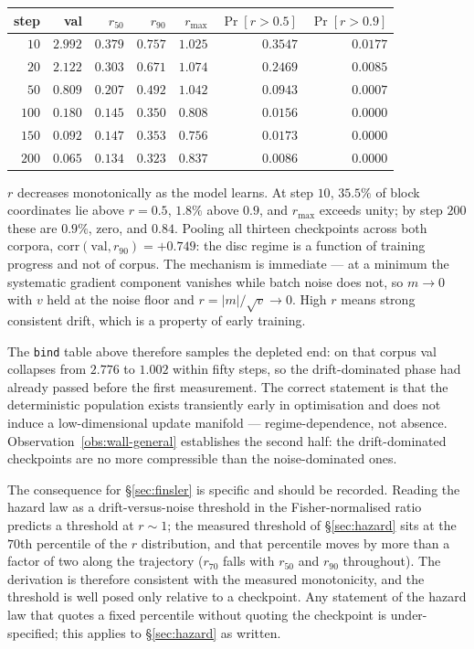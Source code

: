 \begin{center}
\begin{tabular}{rrrrrrr}
\hline
step & val & $r_{50}$ & $r_{90}$ & $r_{\max}$ & $\Pr[r>0.5]$ & $\Pr[r>0.9]$ \\
\hline
$10$  & $2.992$ & $0.379$ & $0.757$ & $1.025$ & $0.3547$ & $0.0177$ \\
$20$  & $2.122$ & $0.303$ & $0.671$ & $1.074$ & $0.2469$ & $0.0085$ \\
$50$  & $0.809$ & $0.207$ & $0.492$ & $1.042$ & $0.0943$ & $0.0007$ \\
$100$ & $0.180$ & $0.145$ & $0.350$ & $0.808$ & $0.0156$ & $0.0000$ \\
$150$ & $0.092$ & $0.147$ & $0.353$ & $0.756$ & $0.0173$ & $0.0000$ \\
$200$ & $0.065$ & $0.134$ & $0.323$ & $0.837$ & $0.0086$ & $0.0000$ \\
\hline
\end{tabular}
\end{center}

\begin{observation}
\label{obs:regime-negative}
$r$ decreases monotonically as the model learns. At step $10$, $35.5\%$ of
block coordinates lie above $r=0.5$, $1.8\%$ above $0.9$, and $r_{\max}$
exceeds unity; by step $200$ these are $0.9\%$, zero, and $0.84$. Pooling all
thirteen checkpoints across both corpora, $\mathrm{corr}(\text{val},r_{90})
= +0.749$: the disc regime is a function of training progress and not of
corpus. The mechanism is immediate --- at a minimum the systematic gradient
component vanishes while batch noise does not, so $m\to0$ with $v$ held at the
noise floor and $r=|m|/\sqrt{v}\to0$. High $r$ means strong consistent drift,
which is a property of early training.
\end{observation}

The \texttt{bind} table above therefore samples the depleted end: on that
corpus val collapses from $2.776$ to $1.002$ within fifty steps, so the
drift-dominated phase had already passed before the first measurement. The
correct statement is that the deterministic population exists transiently early
in optimisation and does not induce a low-dimensional update manifold ---
regime-dependence, not absence. Observation~\ref{obs:wall-general} establishes
the second half: the drift-dominated checkpoints are no more compressible than
the noise-dominated ones.

The consequence for \S\ref{sec:finsler} is specific and should be recorded.
Reading the hazard law as a drift-versus-noise threshold in the
Fisher-normalised ratio predicts a threshold at $r\sim1$; the measured
threshold of \S\ref{sec:hazard} sits at the $70$th percentile of the $r$
distribution, and that percentile moves by more than a factor of two along the
trajectory ($r_{70}$ falls with $r_{50}$ and $r_{90}$ throughout). The
derivation is therefore consistent with the measured monotonicity, and the
threshold is well posed only relative to a checkpoint. Any statement of the
hazard law that quotes a fixed percentile without quoting the checkpoint is
under-specified; this applies to \S\ref{sec:hazard} as written.

